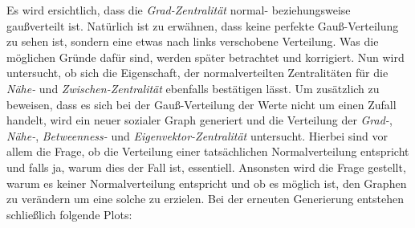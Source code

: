 Es wird ersichtlich, dass die \textit{Grad-Zentralität} normal- beziehungsweise gaußverteilt ist. Natürlich ist zu erwähnen, dass keine perfekte Gauß-Verteilung zu sehen ist, sondern eine etwas nach links verschobene Verteilung. Was die möglichen Gründe dafür sind, werden später betrachtet und korrigiert. Nun wird untersucht, ob sich die Eigenschaft, der  normalverteilten Zentralitäten für die \textit{Nähe-} und \textit{Zwischen-Zentralität} ebenfalls bestätigen lässt. Um zusätzlich zu beweisen, dass es sich bei der Gauß-Verteilung der Werte nicht um einen Zufall handelt, wird ein neuer sozialer Graph generiert und die Verteilung der \textit{Grad-}, \textit{Nähe-}, \textit{Betweenness-} und \textit{Eigenvektor-Zentralität} untersucht. Hierbei sind vor allem die Frage, ob die Verteilung einer tatsächlichen Normalverteilung entspricht und falls ja, warum dies der Fall ist, essentiell. Ansonsten wird die Frage gestellt, warum es keiner Normalverteilung entspricht und ob es möglich ist, den Graphen zu verändern um eine solche zu erzielen. Bei der erneuten Generierung entstehen schließlich folgende Plots:


